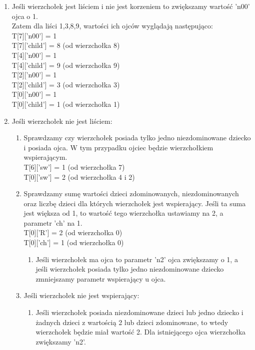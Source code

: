 \begin{enumerate}
    \item Jeśli wierzchołek jest liściem i nie jest korzeniem to zwiększamy wartość 'n00' ojca o 1.\\
    Zatem dla liści 1,3,8,9, wartości ich ojców wyglądają następująco:\\
        T[7]['n00'] = 1  \\
        T[7]['child'] = 8  (od wierzchołka 8)\\
        T[4]['n00'] = 1 \\
        T[4]['child'] = 9  (od wierzchołka 9)\\
        T[2]['n00'] = 1  \\
        T[2]['child'] = 3  (od wierzchołka 3)\\
        T[0]['n00'] = 1 \\
        T[0]['child'] = 1  (od wierzchołka 1)
    \item Jeśli wierzchołek nie jest liściem:
    \begin{enumerate}
        \item Sprawdzamy czy wierzchołek posiada tylko jedno niezdominowane dziecko i posiada ojca. W tym przypadku ojciec będzie wierzchołkiem wspierającym. \\
        T[6]['sw'] = 1 (od wierzchołka 7)\\
        T[0]['sw'] = 2 (od wierzchołka 4 i 2)
        \item Sprawdzamy sumę wartości dzieci zdominowanych, niezdominowanych oraz liczbę dzieci dla których wierzchołek jest wspierający. Jeśli ta suma jest większa od 1, to wartość tego wierzchołka ustawiamy na 2, a parametr 'ch' na 1.\\
        T[0]['R'] = 2  (od wierzchołka 0)\\
        T[0]['ch'] = 1  (od wierzchołka 0)
        \begin{enumerate}
            \item Jeśli wierzchołek ma ojca to parametr 'n2' ojca zwiększamy o 1, a jeśli wierzchołek posiada tylko jedno niezdominowane dziecko zmniejszamy parametr wspierający u ojca.
        \end{enumerate}
        \item Jeśli wierzchołek nie jest wspierający:
            \begin{enumerate}
                \item Jeśli wierzchołek posiada niezdominowane dzieci lub jedno dziecko i żadnych dzieci z wartością 2 lub dzieci zdominowane, to wtedy wierzchołek będzie miał wartość 2. Dla istniejącego ojca wierzchołka zwiększamy 'n2'.\\

\end{enumerate}
\end{enumerate}
\end{enumerate}
